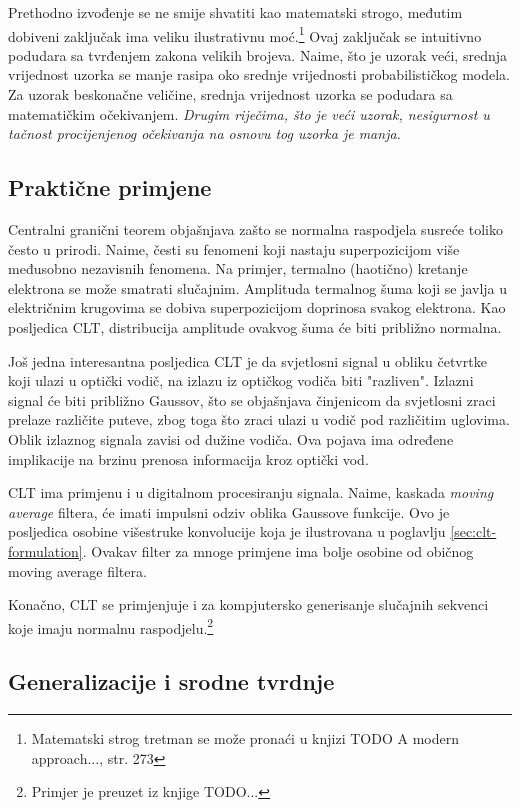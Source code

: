 Prethodno izvođenje se ne smije shvatiti kao matematski strogo, međutim dobiveni
zaključak ima veliku ilustrativnu moć.\footnote{Matematski strog tretman se može
pronaći u knjizi TODO A modern approach..., str. 273} Ovaj zaključak se intuitivno
podudara sa tvrđenjem zakona velikih brojeva.  Naime, što je uzorak veći,
srednja vrijednost uzorka se manje rasipa oko srednje vrijednosti
probabilističkog modela. Za uzorak beskonačne veličine, srednja vrijednost
uzorka se podudara sa matematičkim očekivanjem.  \textit{Drugim riječima, što je
veći uzorak, nesigurnost u tačnost procijenjenog očekivanja na osnovu tog uzorka
je manja.}

\subsection{Praktične primjene}

Centralni granični teorem objašnjava zašto se normalna raspodjela susreće toliko
često u prirodi. Naime, česti su fenomeni koji nastaju superpozicijom više
međusobno nezavisnih fenomena. Na primjer, termalno (haotično) kretanje
elektrona se može smatrati slučajnim. Amplituda termalnog šuma koji se javlja u
električnim krugovima se dobiva superpozicijom doprinosa svakog elektrona. Kao
posljedica CLT, distribucija amplitude ovakvog šuma će biti približno normalna.

Još jedna interesantna posljedica CLT je da svjetlosni signal u obliku četvrtke
koji ulazi u optički vodič, na izlazu iz optičkog vodiča biti "razliven".
Izlazni signal će biti približno Gaussov, što se objašnjava činjenicom da
svjetlosni zraci prelaze različite puteve, zbog toga što zraci ulazi u vodič pod
različitim uglovima. Oblik izlaznog signala zavisi od dužine vodiča. Ova pojava
ima određene implikacije na brzinu prenosa informacija kroz optički vod.

CLT ima primjenu i u digitalnom procesiranju signala. Naime, kaskada
\textit{moving average} filtera, će imati impulsni odziv oblika Gaussove
funkcije. Ovo je posljedica osobine višestruke konvolucije koja je ilustrovana u
poglavlju \ref{sec:clt-formulation}. Ovakav filter za mnoge primjene ima bolje
osobine od običnog moving average filtera.

Konačno, CLT se primjenjuje i za kompjutersko generisanje slučajnih sekvenci
koje imaju normalnu raspodjelu.\footnote{Primjer je preuzet iz knjige TODO...}

\subsection{Generalizacije i srodne tvrdnje}


